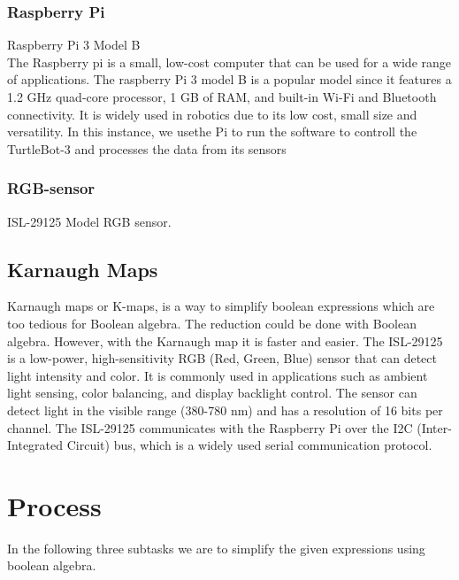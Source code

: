 \documentclass{article}
\begin{document}
\subsubsection*{Raspberry Pi}
Raspberry Pi 3 Model B\\
The Raspberry pi is a small, low-cost computer that can be used for a wide range of applications. The raspberry Pi 3 model B 
is a popular model since it features a 1.2 GHz quad-core processor, 1 GB of RAM, and built-in Wi-Fi and Bluetooth connectivity.
It is widely used in robotics due to its low cost, small size and versatility. In this instance, we usethe Pi to run the software to controll the TurtleBot-3 
and processes the data from its sensors

\subsubsection*{RGB-sensor}
ISL-29125 Model RGB sensor.\\

\subsection*{Karnaugh Maps}
Karnaugh maps or K-maps, is a way to simplify boolean expressions which are too tedious for Boolean algebra. The reduction could be
done with Boolean algebra. However, with the Karnaugh map it is faster and easier.
The ISL-29125 is a low-power, high-sensitivity RGB (Red, Green, Blue) sensor that can detect light intensity and color.
It is commonly used in applications such as ambient light sensing, color balancing, and display backlight control.
The sensor can detect light in the visible range (380-780 nm) and has a resolution of 16 bits per channel.
The ISL-29125 communicates with the Raspberry Pi over the I2C (Inter-Integrated Circuit) bus, which is a widely used serial communication protocol.
\pagebreak

 \addtocounter{section}{1}
\section*{Process}
\noindent In the following three subtasks we are to simplify the given expressions using boolean algebra.
\end{document}
